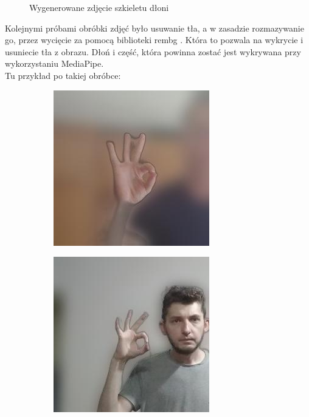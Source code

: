 \documentclass[12pt]{article}
\begin{document}
\begin{sloppypar}
{{\begin{figure}[H]
      \caption{Wygenerowane zdjęcie szkieletu dłoni}
      \label{fig:landmark}
    \end{figure}
    Kolejnymi próbami obróbki zdjęć było usuwanie tła, a w zasadzie rozmazywanie go, przez wycięcie za pomocą biblioteki rembg \cite{rembg}.
    Która to pozwala na wykrycie i usuniecie tła z obrazu. Dłoń i część, która powinna zostać jest wykrywana przy wykorzystaniu MediaPipe. \\
    Tu przykład po takiej obróbce:
    \begin{figure}
      \begin{subfigure}{.5\textwidth}
        \centering
        \includegraphics[width=.8\linewidth]{blurred_just_hand.jpg}
        \label{fig:just-hand}
      \end{subfigure}%
      \begin{subfigure}{.5\textwidth}
        \centering
        \includegraphics[width=.8\linewidth]{blurred.jpg}

\end{subfigure}
\end{figure}}}
\end{sloppypar}
\end{document}
